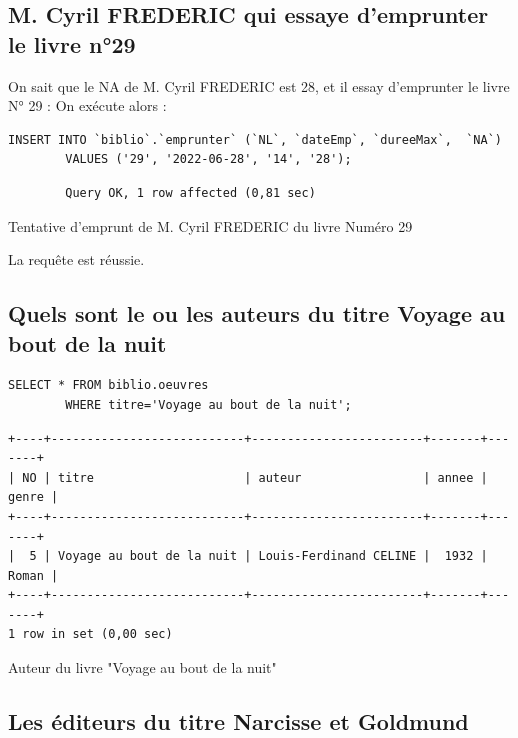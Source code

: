 \documentclass{article}
\begin{document}
\subsection{M. Cyril FREDERIC qui essaye d’emprunter le livre n°29}
On sait que le NA de M. Cyril FREDERIC est 28, et il  essay d'emprunter le livre N° 29 :
On exécute alors :
\begin{listing}[H]
	\begin{verbatim}
INSERT INTO `biblio`.`emprunter` (`NL`, `dateEmp`, `dureeMax`,  `NA`) 
		VALUES ('29', '2022-06-28', '14', '28');
\end{verbatim}
	\begin{verbatim}
		Query OK, 1 row affected (0,81 sec)
\end{verbatim}
	\caption{Tentative d'emprunt de M. Cyril FREDERIC du livre Numéro 29}
\end{listing}
La requête est réussie.

\subsection{Quels sont le ou les auteurs du titre \og Voyage au bout de la nuit \fg}
\begin{center}
	\begin{minipage}{0.8\linewidth}
\begin{listing}[H]
	\begin{verbatim}
SELECT * FROM biblio.oeuvres
		WHERE titre='Voyage au bout de la nuit';
\end{verbatim}
	\begin{verbatim}
+----+---------------------------+------------------------+-------+-------+
| NO | titre                     | auteur                 | annee | genre |
+----+---------------------------+------------------------+-------+-------+
|  5 | Voyage au bout de la nuit | Louis-Ferdinand CELINE |  1932 | Roman |
+----+---------------------------+------------------------+-------+-------+
1 row in set (0,00 sec)
\end{verbatim}
	\caption{Auteur du livre "Voyage au bout de la nuit"}
\end{listing}			
	\end{minipage}
\end{center}


\subsection{Les éditeurs du titre \og Narcisse et Goldmund \fg}
\end{document}
